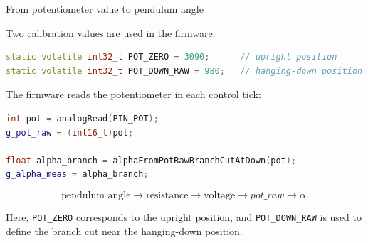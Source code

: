 \documentclass[aspectratio=169]{beamer}
\begin{document}
\begin{frame}[fragile]{From potentiometer value to pendulum angle}

Two calibration values are used in the firmware:

\begin{lstlisting}[language=C++]
static volatile int32_t POT_ZERO = 3090;      // upright position
static volatile int32_t POT_DOWN_RAW = 980;   // hanging-down position
\end{lstlisting}

\vspace{0.15cm}

The firmware reads the potentiometer in each control tick:

\begin{lstlisting}[language=C++]
int pot = analogRead(PIN_POT);
g_pot_raw = (int16_t)pot;

float alpha_branch = alphaFromPotRawBranchCutAtDown(pot);
g_alpha_meas = alpha_branch;
\end{lstlisting}


\[
\text{pendulum angle}
\rightarrow
\text{resistance}
\rightarrow
\text{voltage}
\rightarrow
pot\_raw
\rightarrow
\alpha .
\]

Here, \texttt{POT\_ZERO} corresponds to the upright position, and \texttt{POT\_DOWN\_RAW} is used to define the branch cut near the hanging-down position.

\end{frame}
\end{document}

